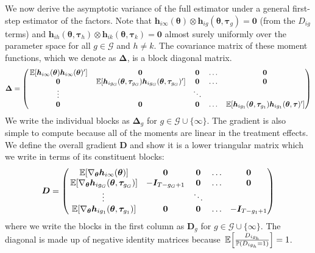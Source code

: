 \documentclass[12pt]{article}
\begin{document}
We now derive the asymptotic variance of the full estimator under a general first-step estimator of the factors. Note that $\bm h_{i\infty}(\bm{\theta}) \otimes \bm h_{ig}(\bm{\theta}, \bm \tau_g) = \bm 0$ (from the $D_{ig}$ terms) and $\bm h_{ih}(\bm{\theta}, \bm \tau_h) \otimes \bm h_{ik}(\bm{\theta}, \bm \tau_k) = \bm 0$ almost surely uniformly over the parameter space for all $g \in \mathcal{G}$ and $h \neq k$. The covariance matrix of these moment functions, which we denote as $\bm \Delta$, is a block diagonal matrix.
\begin{equation*}
    \bm \Delta =
    \begin{pmatrix}
        \expec{\bm h_{i \infty}(\bm{\theta}) \bm h_{i \infty}(\bm{\theta})'} & \bm 0 & \bm 0 & \hdots & \bm 0\\
        \bm 0 &  \expec{\bm h_{i g_G}(\bm{\theta}, \bm \tau_{g_G}) \bm h_{i g_G}(\bm{\theta}, \bm \tau_{g_G})' } & \bm 0 & \hdots & \bm 0\\
        \vdots & & \ddots  &\\
        \bm 0 & \bm 0 & \bm 0 & \hdots & \expec{ \bm h_{i g_1}(\bm{\theta}, \bm \tau_{g_1}) \bm h_{i g_1}(\bm{\theta}, \bm \tau)'}
    \end{pmatrix}
\end{equation*}
We write the individual blocks as $\bm \Delta_g$ for $g \in \mathcal{G} \cup \{ \infty \}$. The gradient is also simple to compute because all of the moments are linear in the treatment effects. We define the overall gradient $\bm D$ and show it is a lower triangular matrix which we write in terms of its constituent blocks:
\begin{equation*}
    \bm D = 
    \begin{pmatrix}
        \expec{\nabla_{\bm{\theta}} \bm h_{i\infty}(\bm{\theta}) } & \bm 0 & \bm 0 & \hdots & \bm 0\\
        \expec{\nabla_{\bm{\theta}} \bm h_{ig_G}(\bm{\theta}, \bm \tau_{g_G})} & -\bm I_{T - g_G + 1} & \bm 0 & \hdots & \bm 0\\
        \vdots & & \ddots  &\\
        \expec{\nabla_{\bm{\theta}} \bm h_{ig_1}(\bm{\theta}, \bm \tau_{g_1})} & \bm 0 & \bm 0 & \hdots & -\bm I_{T - g_1 + 1}
    \end{pmatrix}
\end{equation*}
where we write the blocks in the first column as $\bm D_g$ for $g \in \mathcal{G} \cup \{ \infty \}$. The diagonal is made up of negative identity matrices because $\expec{\frac{D_{ig_h}}{\mathbb{P}(D_{ig_h} = 1)}} = 1$.
\end{document}
